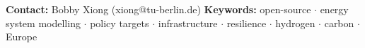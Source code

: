 \documentclass[a0,portrait]{a0poster}
\begin{document}
\vfill %

\begin{center}
  \colorbox{red100}{\parbox{1\linewidth}{
    \centering
    \color{white}
    \textbf{Contact:} Bobby Xiong (xiong@tu-berlin.de) \quad
    \textbf{Keywords:} open-source $\cdot$ energy system modelling $\cdot$ policy targets $\cdot$ infrastructure $\cdot$ resilience $\cdot$ hydrogen $\cdot$ carbon $\cdot$ Europe 
  }}
\end{center}
\end{document}
